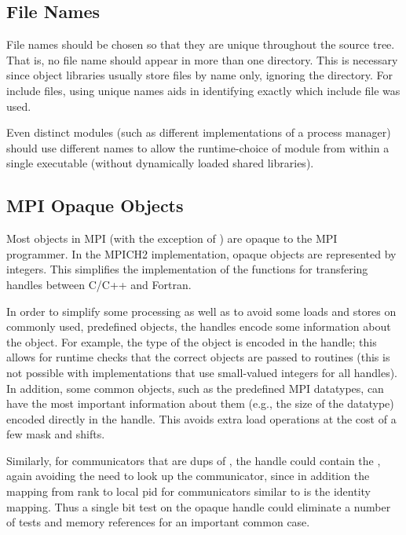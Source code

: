 \documentclass{article}
\begin{document}
\subsection{File Names}
\label{sec:mpi-src-filenames}
File names should be chosen so that they are unique throughout the source
tree.  That is, no file name should appear in more than one directory.  This
is necessary since object libraries usually store files by name only, ignoring
the directory.  For include files, using unique names aids in identifying
exactly which include file was used.

Even distinct modules (such as different implementations of a process
manager) should use different names to allow the runtime-choice of
module from within a single executable (without dynamically loaded
shared libraries).

\subsection{MPI Opaque Objects}
\label{sec:mpi-opaque}
Most objects in MPI (with the exception of ) are
opaque to the MPI programmer.  In the MPICH2 implementation, opaque
objects are represented 
by integers.  This simplifies the implementation of the functions for
transfering handles between C/C++ and Fortran.  

In order to simplify some processing as well as to avoid some loads
and stores on commonly used, predefined objects, the handles encode
some information about the object.  For example, the type of the
object is encoded in the handle; this allows for runtime checks that
the correct objects are passed to routines (this is not possible with
implementations that use small-valued integers for all handles).  In
addition, some common objects, such as the predefined MPI datatypes,
can have the most important information about them (e.g., the size of
the datatype) encoded directly in the handle.  This avoids extra load
operations at the cost of a few mask and shifts. 

Similarly, for
communicators that are dups of , the handle could
contain the , again avoiding the need to look up the
communicator, since in addition the mapping from rank to local pid for 
communicators similar to  is the identity
mapping.  Thus a single bit test on the opaque handle could eliminate
a number of tests and memory references for an important common case.
\end{document}
